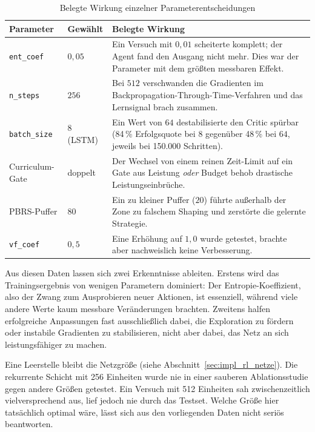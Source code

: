 \documentclass[
  a4paper,
  11pt,
  twoside,
  BCOR=8mm,           %
  headings=big,
  numbers=noenddot,
  listof=totoc,       %
  captions=tableheading,
]{scrreprt}
\begin{document}
\begin{table}[htbp]
    \centering
    \caption{Belegte Wirkung einzelner Parameterentscheidungen}
    \label{tab:hyperparameter_wirkung}
    \begin{tabular}{p{2.9cm}p{2.4cm}p{7.9cm}}
        \hline
        \textbf{Parameter} & \textbf{Gewählt} & \textbf{Belegte Wirkung} \\
        \hline
        \texttt{ent\_coef} & $0{,}05$ & Ein Versuch mit $0{,}01$ scheiterte komplett; der Agent fand den Ausgang nicht mehr. Dies war der Parameter mit dem größten messbaren Effekt. \\
        \texttt{n\_steps} & $256$ & Bei $512$ verschwanden die Gradienten im Backpropagation-Through-Time-Verfahren und das Lernsignal brach zusammen. \\
        \texttt{batch\_size} & $8$ (LSTM) & Ein Wert von $64$ destabilisierte den Critic spürbar (84\,\% Erfolgsquote bei $8$ gegenüber 48\,\% bei $64$, jeweils bei 150.000 Schritten). \\
        Curriculum-Gate & doppelt & Der Wechsel von einem reinen Zeit-Limit auf ein Gate aus Leistung \textit{oder} Budget behob drastische Leistungseinbrüche. \\
        PBRS-Puffer & $80$ & Ein zu kleiner Puffer ($20$) führte außerhalb der Zone zu falschem Shaping und zerstörte die gelernte Strategie. \\
        \texttt{vf\_coef} & $0{,}5$ & Eine Erhöhung auf $1{,}0$ wurde getestet, brachte aber nachweislich keine Verbesserung. \\
        \hline
    \end{tabular}
\end{table}

Aus diesen Daten lassen sich zwei Erkenntnisse ableiten. Erstens wird das Trainingsergebnis von wenigen Parametern dominiert: Der Entropie-Koeffizient, also der Zwang zum Ausprobieren neuer Aktionen, ist essenziell, während viele andere Werte kaum messbare Veränderungen brachten. Zweitens halfen erfolgreiche Anpassungen fast ausschließlich dabei, die Exploration zu fördern oder instabile Gradienten zu stabilisieren, nicht aber dabei, das Netz an sich leistungsfähiger zu machen.

Eine Leerstelle bleibt die Netzgröße (siehe Abschnitt~\ref{sec:impl_rl_netze}). Die rekurrente Schicht mit 256 Einheiten wurde nie in einer sauberen Ablationsstudie gegen andere Größen getestet. Ein Versuch mit 512 Einheiten sah zwischenzeitlich vielversprechend aus, lief jedoch nie durch das Testset. Welche Größe hier tatsächlich optimal wäre, lässt sich aus den vorliegenden Daten nicht seriös beantworten.
\end{document}
